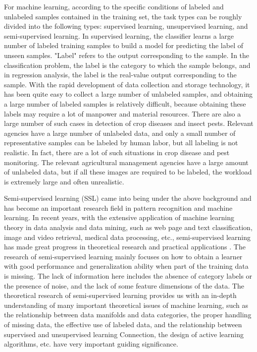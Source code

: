 \documentclass[11pt,en]{elegantpaper}
\begin{document}
For machine learning, according to the specific conditions of labeled and unlabeled samples contained in the training set, the task types can be roughly divided into the following types: supervised learning, unsupervised learning, and semi-supervised learning. In supervised learning, the classifier learns a large number of labeled training samples to build a model for predicting the label of unseen samples. "Label" refers to the output corresponding to the sample. In the classification problem, the label is the category to which the sample belongs, and in regression analysis, the label is the real-value output corresponding to the sample. With the rapid development of data collection and storage technology, it has been quite easy to collect a large number of unlabeled samples, and obtaining a large number of labeled samples is relatively difficult, because obtaining these labels may require a lot of manpower and material resources. There are also a large number of such cases in detection of crop diseases and insect pests. Relevant agencies have a large number of unlabeled data, and only a small number of representative samples can be labeled by human labor, but all labeling is not realistic. In fact, there are a lot of such situations in crop disease and pest monitoring. The relevant agricultural management agencies have a large amount of unlabeled data, but if all these images are required to be labeled, the workload is extremely large and often unrealistic.

Semi-supervised learning (SSL) came into being under the above background and has become an important research field in pattern recognition and machine learning. In recent years, with the extensive application of machine learning theory in data analysis and data mining, such as web page and text classification, image and video retrieval, medical data processing, etc., semi-supervised learning has made great progress in theoretical research and practical applications . The research of semi-supervised learning mainly focuses on how to obtain a learner with good performance and generalization ability when part of the training data is missing. The lack of information here includes the absence of category labels or the presence of noise, and the lack of some feature dimensions of the data. The theoretical research of semi-supervised learning provides us with an in-depth understanding of many important theoretical issues of machine learning, such as the relationship between data manifolds and data categories, the proper handling of missing data, the effective use of labeled data, and the relationship between supervised and unsupervised learning Connection, the design of active learning algorithms, etc. have very important guiding significance.
\end{document}
